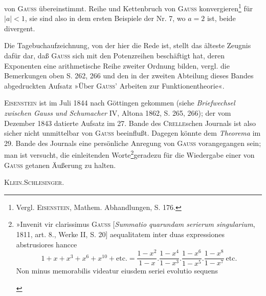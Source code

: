\clearpage{}
\begingroup\small
\noindent von \textsc{Gauss} übereinstimmt. Reihe und Kettenbruch von \textsc{Gauss} konvergieren\footnote{Vergl. \textsc{Eisenstein}, Mathem. Abhandlungen, S. 176.} für \(|a|<1\), sie sind also in dem ersten Beispiele der Nr. 7, wo \(a=2\) ist, beide divergent.

\indent Die Tagebuchaufzeichnung, von der hier die Rede ist, stellt das älteste  Zeugnis dafür dar, daß \textsc{Gauss} sich mit den Potenzreihen beschäftigt hat, deren Exponenten eine arithmetische Reihe zweiter Ordnung bilden, vergl. die Bemerkungen oben S. 262, 266 und den in der zweiten Abteilung dieses Bandes abgedruckten Aufsatz »Über \textsc{Gauss}' Arbeiten zur Funktionentheorie«.

\indent \textsc{Eisenstein} ist im Juli 1844 nach Göttingen gekommen (siehe \textit{Briefwechsel zwischen Gauss und Schumacher} IV, Altona 1862, S. 265, 266); der vom Dezember 1843 datierte Aufsatz im 27. Bande des \textsc{Crelle}schen Journals ist also sicher nicht unmittelbar von \textsc{Gauss} beeinflußt. Dagegen könnte dem \textit{Theorema} im 29. Bande des Journals eine persönliche Anregung von \textsc{Gauss} vorangegangen sein; man ist versucht, die einleitenden Worte\begingroup\renewcommand{\thefootnote}{**)}\footnote{»Invenit vir clarissimus \textsc{Gauss} [\textit{Summatio quarundam serierum singularium}, 1811, art. 8., Werke II, S. 20] aequalitatem inter duas expressiones abstrusiores hancce
\[
1+x+x^3+x^6+x^{10}+\text{etc.}=\frac{1-x^2}{1-x}.\frac{1-x^4}{1-x^3}.\frac{1-x^6}{1-x^5}.\frac{1-x^8}{1-x^7}\ \text{etc.}
\]
\noindent Non minus memorabilis videatur eiusdem seriei evolutio sequens
\begin{center}
\end{center}
}\endgroup geradezu für die Wiedergabe einer von \textsc{Gauss} getanen Äußerung zu halten.
\par\noindent\hfill\textsc{Klein.\quad Schlesinger.}
\par\endgroup
